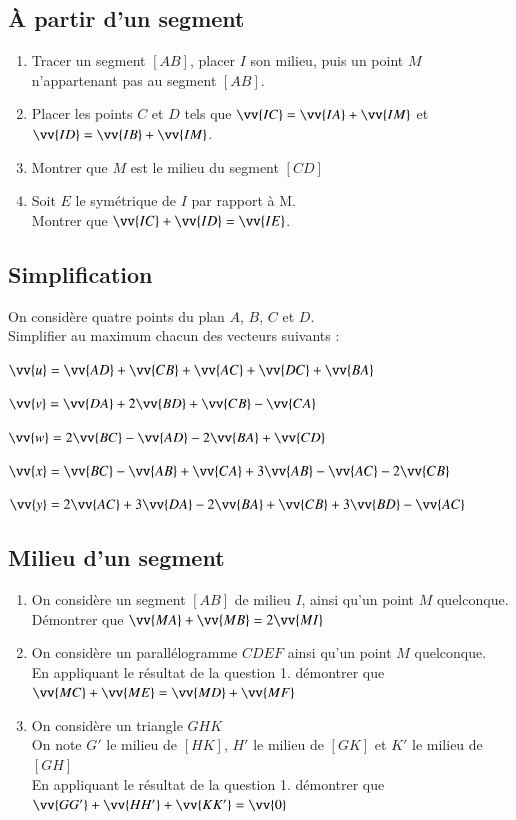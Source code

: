 \documentclass[oneside,12pt]{article}          %
\begin{document}
\subsection{À partir d'un segment}
\begin{enumerate}
    \item Tracer un segment $[AB]$, placer $I$ son milieu, puis un point $M$ n'appartenant pas au segment $[AB]$.
    \item Placer les points $C$ et $D$ tels que $\vv{IC}=\vv{IA}+\vv{IM}$ et $\vv{ID}=\vv{IB}+\vv{IM}$.
    \item Montrer que $M$ est le milieu du segment $[CD]$
    \item Soit $E$ le symétrique de $I$ par rapport à M. \\Montrer que $\vv{IC}+\vv{ID}=\vv{IE}$.
\end{enumerate}



\subsection{Simplification}
On considère quatre points du plan $A$, $B$, $C$ et $D$.\\
Simplifier au maximum chacun des vecteurs suivants :

$\vv{u}=\vv{AD}+\vv{CB}+\vv{AC}+\vv{DC}+\vv{BA}$

$\vv{v}=\vv{DA}+2\vv{BD}+\vv{CB}-\vv{CA}$

$\vv{w}=2\vv{BC}-\vv{AD}-2\vv{BA}+\vv{CD}$

$\vv{x}=\vv{BC}-\vv{AB}+\vv{CA}+3\vv{AB}-\vv{AC}-2\vv{CB}$

$\vv{y}=2\vv{AC}+3\vv{DA}-2\vv{BA}+\vv{CB}+3\vv{BD}-\vv{AC}$



\subsection{Milieu d'un segment}
\begin{enumerate}
	\item On considère un segment $[AB]$ de milieu $I$, ainsi qu'un point $M$ quelconque. \\
	Démontrer que $\vv{MA}+\vv{MB}=2\vv{MI}$
	\item On considère un parallélogramme $CDEF$ ainsi qu'un point $M$ quelconque. \\
	En appliquant le résultat de la question 1. démontrer que $\vv{MC}+\vv{ME}=\vv{MD}+\vv{MF}$
	\item On considère un triangle $GHK$\\
	On note $G'$ le milieu de $[HK]$, $H'$ le milieu de $[GK]$ et $K'$ le milieu de $[GH]$ \\
	En appliquant le résultat de la question 1. démontrer que $\vv{GG'}+\vv{HH'}+\vv{KK'}=\vv{0}$
\end{enumerate}
\end{document}
